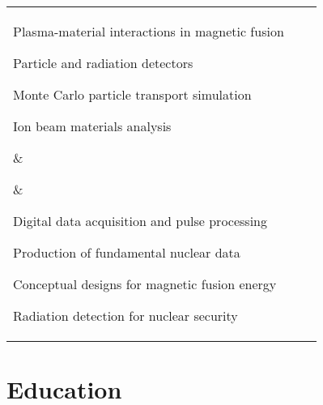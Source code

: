 \documentclass[10pt]{article}
\begin{document}
\begin{tabular}[t]{@{}p{\textwidth-\rcollength-\spacewidth}@{}p{\spacewidth}@{}p{\rcollength}}%

\parbox{\textwidth-\rcollength-\spacewidth}{%
\begin{innerlist}
\item Plasma-material interactions in magnetic fusion
\item Particle and radiation detectors
\item Monte Carlo particle transport simulation
\item Ion beam materials analysis
\end{innerlist}
}
& \parbox{\spacewidth}{\centering} &

\parbox{\rcollength}{%

\begin{innerlist}
\item Digital data acquisition and pulse processing
\item Production of fundamental nuclear data
\item Conceptual designs for magnetic fusion energy
\item Radiation detection for nuclear security
\end{innerlist}
}
\end{tabular}

\vspace{0.4cm}

\section{Education}
\end{document}
